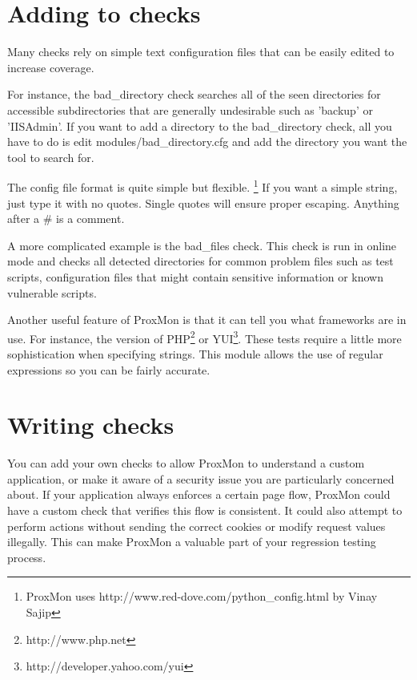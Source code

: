 \documentclass{article}
\begin{document}
\section{Adding to checks}
Many checks rely on simple text configuration files that can be easily edited to 
increase coverage.

For instance, the bad\_directory check searches all of the seen directories for accessible
subdirectories that are generally undesirable such as 'backup' or 'IISAdmin'.
If you want to add a directory to the bad\_directory check, all you have to do
is edit modules/bad\_directory.cfg and add the directory you want the tool to search for.


The config file format is quite simple but flexible. 
\footnote{ProxMon uses http://www.red-dove.com/python\_config.html by Vinay Sajip}
If you want a simple string, just type it with no quotes.  Single quotes will ensure 
proper escaping.  Anything after a \# is a comment.

A more complicated example is the bad\_files check.  This check is run in online mode 
and checks all detected directories for common problem files such as test scripts, 
configuration files that might contain sensitive information or known vulnerable scripts.


Another useful feature of ProxMon is that it can tell you what frameworks are in 
use.  For instance, the version of PHP\footnote{http://www.php.net} or 
YUI\footnote{http://developer.yahoo.com/yui}.  These tests require a little more
sophistication when specifying strings.  This module allows the use of regular
expressions so you can be fairly accurate.  


\section{Writing checks}
You can add your own checks to allow ProxMon to understand a custom application, or 
make it aware of a security issue you are particularly concerned about. If your 
application always enforces a certain page flow, ProxMon could have a custom check 
that verifies this flow is consistent. It could also attempt to perform actions 
without sending the correct cookies or modify request values illegally. This can make 
ProxMon a valuable part of your regression testing process.  
\end{document}
